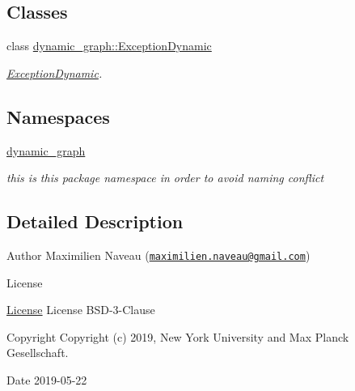 \subsection*{Classes}
\begin{DoxyCompactItemize}
\item 
class \hyperlink{classdynamic__graph_1_1ExceptionDynamic}{dynamic\+\_\+graph\+::\+Exception\+Dynamic}
\begin{DoxyCompactList}\small\item\em \hyperlink{classdynamic__graph_1_1ExceptionDynamic}{Exception\+Dynamic}. \end{DoxyCompactList}\end{DoxyCompactItemize}
\subsection*{Namespaces}
\begin{DoxyCompactItemize}
\item 
 \hyperlink{namespacedynamic__graph}{dynamic\+\_\+graph}
\begin{DoxyCompactList}\small\item\em this is this package namespace in order to avoid naming conflict \end{DoxyCompactList}\end{DoxyCompactItemize}


\subsection{Detailed Description}
\begin{DoxyAuthor}{Author}
Maximilien Naveau (\href{mailto:maximilien.naveau@gmail.com}{\tt maximilien.\+naveau@gmail.\+com}) 
\end{DoxyAuthor}
\begin{DoxyRefDesc}{License}
\item[\hyperlink{license__license000007}{License}]License B\+S\+D-\/3-\/\+Clause \end{DoxyRefDesc}
\begin{DoxyCopyright}{Copyright}
Copyright (c) 2019, New York University and Max Planck Gesellschaft. 
\end{DoxyCopyright}
\begin{DoxyDate}{Date}
2019-\/05-\/22 
\end{DoxyDate}
